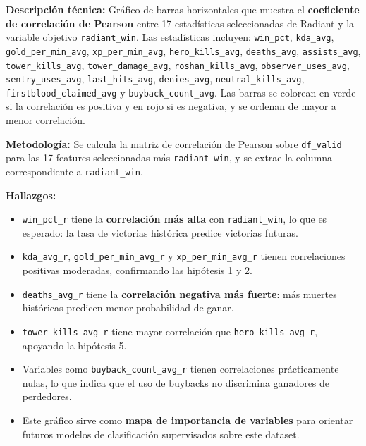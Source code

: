 \documentclass[12pt,a4paper]{article}
\begin{document}
\textbf{Descripción técnica:} Gráfico de barras horizontales que muestra el
\textbf{coeficiente de correlación de Pearson} entre 17 estadísticas
seleccionadas de Radiant y la variable objetivo \texttt{radiant\_win}. Las
estadísticas incluyen: \texttt{win\_pct}, \texttt{kda\_avg},
\texttt{gold\_per\_min\_avg}, \texttt{xp\_per\_min\_avg}, \texttt{hero\_kills\_avg},
\texttt{deaths\_avg}, \texttt{assists\_avg}, \texttt{tower\_kills\_avg},
\texttt{tower\_damage\_avg}, \texttt{roshan\_kills\_avg},
\texttt{observer\_uses\_avg}, \texttt{sentry\_uses\_avg}, \texttt{last\_hits\_avg},
\texttt{denies\_avg}, \texttt{neutral\_kills\_avg},
\texttt{firstblood\_claimed\_avg} y \texttt{buyback\_count\_avg}. Las barras se
colorean en verde si la correlación es positiva y en rojo si es negativa, y se
ordenan de mayor a menor correlación.
 
\textbf{Metodología:} Se calcula la matriz de correlación de Pearson sobre
\texttt{df\_valid} para las 17 features seleccionadas más \texttt{radiant\_win},
y se extrae la columna correspondiente a \texttt{radiant\_win}.
 
\textbf{Hallazgos:}
\begin{itemize}
  \item \texttt{win\_pct\_r} tiene la \textbf{correlación más alta} con
        \texttt{radiant\_win}, lo que es esperado: la tasa de victorias histórica
        predice victorias futuras.
  \item \texttt{kda\_avg\_r}, \texttt{gold\_per\_min\_avg\_r} y
        \texttt{xp\_per\_min\_avg\_r} tienen correlaciones positivas moderadas,
        confirmando las hipótesis 1 y 2.
  \item \texttt{deaths\_avg\_r} tiene la \textbf{correlación negativa más
        fuerte}: más muertes históricas predicen menor probabilidad de ganar.
  \item \texttt{tower\_kills\_avg\_r} tiene mayor correlación que
        \texttt{hero\_kills\_avg\_r}, apoyando la hipótesis 5.
  \item Variables como \texttt{buyback\_count\_avg\_r} tienen correlaciones
        prácticamente nulas, lo que indica que el uso de buybacks no discrimina
        ganadores de perdedores.
  \item Este gráfico sirve como \textbf{mapa de importancia de variables} para
        orientar futuros modelos de clasificación supervisados sobre este dataset.
\end{itemize}

\end{document}
